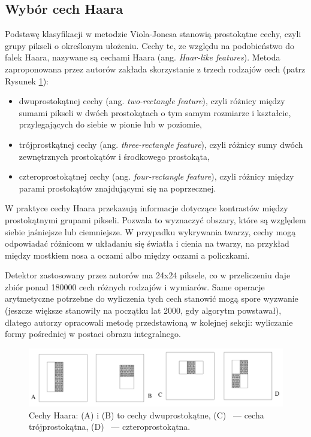 \documentclass[12pt,a4paper,leqno,oneside,titlepage]{book}
\begin{document}
\subsection{Wybór cech Haara}
Podstawę klasyfikacji w metodzie Viola-Jonesa stanowią prostokątne cechy, czyli grupy pikseli o określonym ułożeniu. Cechy te, ze względu na podobieństwo do falek Haara, nazywane są cechami Haara (ang. \textit{Haar-like features}). Metoda zaproponowana przez autorów zakłada skorzystanie z trzech rodzajów cech (patrz Rysunek \ref{fig:haar_features}):
\begin{itemize}
	\item dwuprostokątnej cechy (ang. \textit{two-rectangle feature}), czyli różnicy między sumami pikseli w dwóch prostokątach o tym samym rozmiarze i kształcie, przylegających do siebie w pionie lub w poziomie,
	\item trójprostkątnej cechy (ang. \textit{three-rectangle feature}), czyli różnicy sumy dwóch zewnętrznych prostokątów i środkowego prostokąta,
	\item czteroprostokątnej cechy (ang. \textit{four-rectangle feature}), czyli różnicy między parami prostokątów znajdującymi się na poprzecznej.
\end{itemize}

W praktyce cechy Haara przekazują informacje dotyczące kontrastów między prostokątnymi grupami pikseli. Pozwala to wyznaczyć obszary, które są względem siebie jaśniejsze lub ciemniejsze. W przypadku wykrywania twarzy, cechy mogą odpowiadać różnicom w układaniu się światła i cienia na twarzy, na przykład między mostkiem nosa a oczami albo między oczami a policzkami.

Detektor zastosowany przez autorów ma 24x24 piksele, co w przeliczeniu daje zbiór ponad 180000 cech różnych rodzajów i wymiarów. Same operacje arytmetyczne potrzebne do wyliczenia tych cech stanowić mogą spore wyzwanie (jeszcze większe stanowiły na początku lat 2000, gdy algorytm powstawał), dlatego autorzy opracowali metodę przedstawioną w kolejnej sekcji: wyliczanie formy pośredniej w postaci obrazu integralnego.\cite{ViolaJones01}

\begin{figure}[!tbp]
  \centering
  \begin{minipage}[b]{0.9\textwidth}
    \includegraphics[width=\textwidth]{pictures/Haar_features.png}
    \caption{Cechy Haara: (A) i (B) to cechy dwuprostokątne, (C) ~--- cecha trójprostokątna, (D) ~--- czteroprostokątna.\cite{ViolaJones01}}
    \label{fig:haar_features}
  \end{minipage}
\end{figure}
\end{document}
